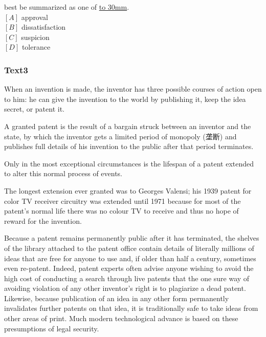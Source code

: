\documentclass[a4paper]{article}
\begin{document}
best be summarized as one of \underline{\hbox to 30mm{}}.\\$[A]$ approval\\$[B]$ dissatisfaction\\$[C]$ suspicion\\$[D]$ tolerance\\\subsubsection{Text3}

\par
When an invention is made, the inventor has three possible courses of action open to him: he can give the invention to the world by publishing it, keep the idea secret, or patent it.

\par
A granted patent is the result of a bargain struck between an inventor and the state, by which the inventor gets a limited period of monopoly (垄断) and publishes full details of his invention to the public after that period terminates.

\par
Only in the most exceptional circumstances is the lifespan of a patent extended to alter this normal process of events.

\par
The longest extension ever granted was to Georges Valensi; his 1939 patent for color TV receiver circuitry was extended until 1971 because for most of the patent’s normal life there was no colour TV to receive and thus no hope of reward for the invention.

\par
Because a patent remains permanently public after it has terminated, the shelves of the library attached to the patent office contain details of literally millions of ideas that are free for anyone to use and, if older than half a century, sometimes even re-patent. Indeed, patent experts often advise anyone wishing to avoid the high cost of conducting a search through live patents that the one sure way of avoiding violation of any other inventor’s right is to plagiarize a dead patent. Likewise, because publication of an idea in any other form permanently invalidates further patents on that idea, it is traditionally safe to take ideas from other areas of print. Much modern technological advance is based on these presumptions of legal security.
\end{document}
